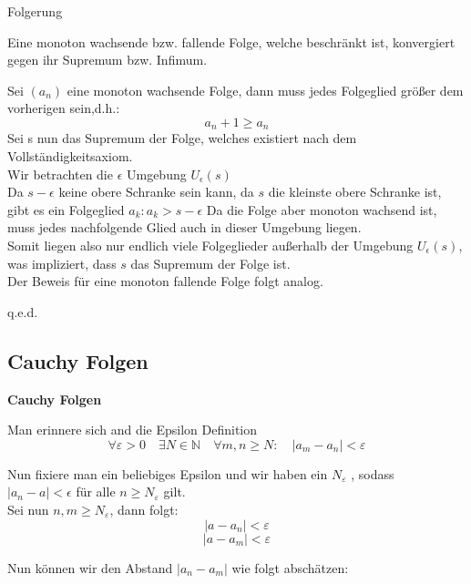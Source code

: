 \documentclass[headsepline,12pt,a4paper]{scrartcl}
\begin{document}
\item[Folgerung]
\item Eine monoton wachsende bzw. fallende Folge, welche beschränkt ist, konvergiert gegen ihr Supremum bzw. Infimum. 
\item Sei $(a_n)$ eine monoton wachsende Folge, dann muss jedes Folgeglied größer dem vorherigen sein,d.h.:
$$ a_n+1 \geq a_n $$ 
Sei s nun das Supremum der Folge, welches existiert nach dem Vollständigkeitsaxiom. \\
Wir betrachten die $\epsilon$ Umgebung $U_\epsilon (s)$ \\
Da $s-\epsilon$ keine obere Schranke sein kann, da $s$ die kleinste obere Schranke ist, gibt es ein Folgeglied $a_k : a_k > s- \epsilon $ Da die Folge aber monoton wachsend ist, muss jedes nachfolgende Glied auch in dieser Umgebung liegen. \\
Somit liegen also nur endlich viele Folgeglieder außerhalb der Umgebung $U_\epsilon (s)$, was impliziert, dass $s$ das Supremum der Folge ist.\\
Der Beweis für eine monoton fallende Folge folgt analog. \\
\begin{flushright}
q.e.d.
\end{flushright}

\newpage

\subsection*{Cauchy Folgen}


\begin{center}
\item[\textbf{Cauchy Folgen}]
\end{center}
\item Man erinnere sich and die Epsilon Definition $$ \forall \varepsilon>0 \quad \exists N\in\mathbb{N} \quad \forall m,n \ge N \colon \quad \left|a_m-a_n \right|<\varepsilon $$

\item Nun fixiere man ein beliebiges Epsilon und wir haben ein $N_\varepsilon$ , sodass \\
$ |a_n -a | < \epsilon $ für alle $ n \geq N_\varepsilon $ gilt. \\
Sei nun $n,m \geq N_\varepsilon $, dann folgt: \\
$$ |a-a_n| < \varepsilon $$
$$ |a-a_m| < \varepsilon $$

\item Nun können wir den Abstand $|a_n-a_m|$ wie folgt abschätzen:
\end{document}
